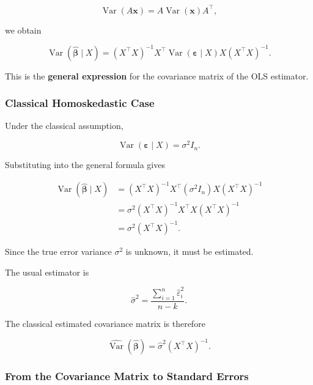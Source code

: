 \[
\operatorname{Var}(A\mathbf{x})
=
A\operatorname{Var}(\mathbf{x})A^\top,
\]

we obtain

\[
\boxed{
\operatorname{Var}
\left(
\widehat{\boldsymbol{\beta}}\mid X
\right)
=
(X^\top X)^{-1}
X^\top
\operatorname{Var}
(\boldsymbol{\varepsilon}\mid X)
X
(X^\top X)^{-1}.
}
\]

This is the \textbf{general expression} for the covariance matrix of the OLS
estimator.



\subsubsection*{Classical Homoskedastic Case}

Under the classical assumption,

\[
\operatorname{Var}
(\boldsymbol{\varepsilon}\mid X)
=
\sigma^2I_n.
\]

Substituting into the general formula gives

\[
\begin{aligned}
\operatorname{Var}
\left(
\widehat{\boldsymbol{\beta}}\mid X
\right)
&=
(X^\top X)^{-1}
X^\top
(\sigma^2I_n)
X
(X^\top X)^{-1}
\\
&=
\sigma^2
(X^\top X)^{-1}
X^\top X
(X^\top X)^{-1}
\\
&=
\boxed{
\sigma^2
(X^\top X)^{-1}.
}
\end{aligned}
\]

Since the true error variance \(\sigma^2\) is unknown, it must be estimated.

The usual estimator is

\[
\boxed{
\widehat{\sigma}^2
=
\frac{
\sum_{i=1}^{n}
\widehat{\varepsilon}_i^2
}{
n-k
}.
}
\]

The classical estimated covariance matrix is therefore

\[
\boxed{
\widehat{\operatorname{Var}}
\left(
\widehat{\boldsymbol{\beta}}
\right)
=
\widehat{\sigma}^2
(X^\top X)^{-1}.
}
\]



\subsubsection*{From the Covariance Matrix to Standard Errors}

